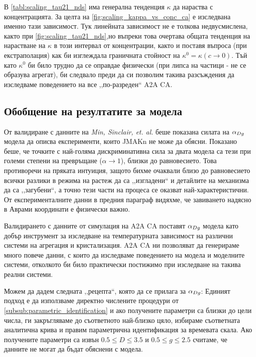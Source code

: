 В \autoref{tabl:scaling_tau21_nds} има генерална тенденция $\kappa$ да нараства с концентрацията. За целта на \autoref{fig:scaling_kappa_vs_conc_ca} е изследвана именно тази зависимост. Тук линейната зависимост не е толкова недвусмислена, както при \autoref{fig:scaling_tau21_nds},но въпреки това очертава общата тенденция на нарастване на $\kappa$ в този интервал от концентрации, както и поставя въпроса (при екстраполация) как би изглеждала граничната стойност на $\kappa^0 = \kappa (c \rightarrow 0)$. Тъй като $\kappa ^ 0$ би било трудно да се оправдае физически (при липса на частици - не се образува агрегат), би следвало преди да си позволим такива разсъждения да изследваме поведението на все ,,по-разреден`` A2A CA.

\subsection{Обобщение на резултатите за модела} 
От валидиране с данните на \textit{Min, Sinclair, et. al.} \cite{Min2005} беше показана силата на $\alpha_{Dg}$ модела да описва експерименти, които JMAKn не може да обясни. Показано беше, че точките с най-голяма дискриминативна сила за двата модела са тези при големи степени на превръщане ($\alpha \rightarrow 1$), близки до равновесието. Това противоречи на пряката интуиция, защото бихме очаквали близо до равновесието всички разлики в режима на растеж да са ,,изгладени`` и детайлите на механизма да са ,,загубени``, а точно тези части на процеса се оказват най-характеристични. От експерименталните данни в предния параграф видяхме, че завиването надясно в Аврами координати е физически важно.

Валидирането с данните от симулация на A2A CA поставят $\alpha_{Dg}$ модела като добър инструмент за изследване на температурната зависимост на различни системи на агрегация и кристализация. A2A CA ни позволяват да генерираме много повече данни, с които да изследваме поведението на модела и моделните системи, отколкото би било практически постижимо при изследване на такива реални системи.

Можем да дадем следната ,,рецепта``, която да се прилага за $\alpha_{Dg}$:
Единият подход е да използваме директно числените процедури от \autoref{subsub:parametric_identification} и ако получените параметри са близки до цели числа, ги закръгляваме до съответното най-близко цяло, избираме съответната аналитична крива и правим параметрична идентификация за времевата скала. Ако получените параметри са извън $ 0.5 \le D \le 3.5$ и $0.5 \le g \le 2.5$ считаме, че данните не могат да бъдат обяснени с модела. 

